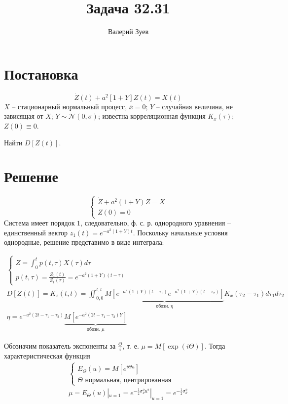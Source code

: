 \documentclass[a4paper,12pt]{article}
\begin{document}
\title{Задача 32.31}
\author{Валерий Зуев}
\maketitle

\section{Постановка}
\[ \dot Z(t) + a^2 [1 + Y]Z(t) = X(t) \]
$X$ -- стационарный нормальный процесс, $\bar x = 0$; $Y$ -- случайная величина, не зависящая от $X$; $Y \sim \mathcal{N}(0,\sigma)$; известна корреляционная функция $K_x(\tau)$; $Z(0)\equiv0$.

Найти $D[Z(t)]$.

\section{Решение}

\[\begin{cases}
    \dot Z + a^2(1+Y) Z = X \\
    Z(0)=0
\end{cases}\]
Система имеет порядок $1$, следовательно, ф. с. р. однородного уравнения -- единственный вектор  $z_1(t) = e^{-a^2(1+Y)t}$.
Поскольку начальные условия однородные, решение представимо в виде интеграла:

\begin{gather*}
    \begin{cases}
        Z = \int_{0}^{t} p(t, \tau) X(\tau) d \tau \\
        p(t,\tau) = \frac{Z_1(t)}{Z_1(\tau)} = e^{-a^2(1+Y)(t-\tau)}
    \end{cases} \\
    D[Z(t)] = K_z(t,t) = \iint_{0,0}^{t,t} \underbrace{M\left[ e^{-a^2(1+Y)(t-\tau_1)} e^{-a^2(1+Y)(t-\tau_2)} \right]}_{\text{обозн. }\eta} K_x(\tau_2-\tau_1) d\tau_1 d\tau_2 \\
    \eta = e^{-a^2(2t-\tau_1-\tau_2)} \underbrace{M\left[ e^{-a^2(2t-\tau_1-\tau_2)Y} \right]}_{\text{обозн. } \mu}
\end{gather*}

Обозначим показатель экспоненты за $\frac{\Theta}{i}$, т. е. $ \mu = M[\exp(i\Theta)] $.
Тогда характеристическая функция
\begin{gather*}
    \begin{cases}
        E_\Theta(u) = M[e^{i\Theta u}] \\
        \Theta \text{ нормальная, центрированная}
    \end{cases} \\
    \mu = E_\Theta(u)|_{u=1} = e^{-\frac{1}{2}\sigma_{\theta}^2 u^2}|_{u=1} = e^{-\frac{1}{2}\sigma_{\theta}^2}
\end{gather*}
\end{document}
